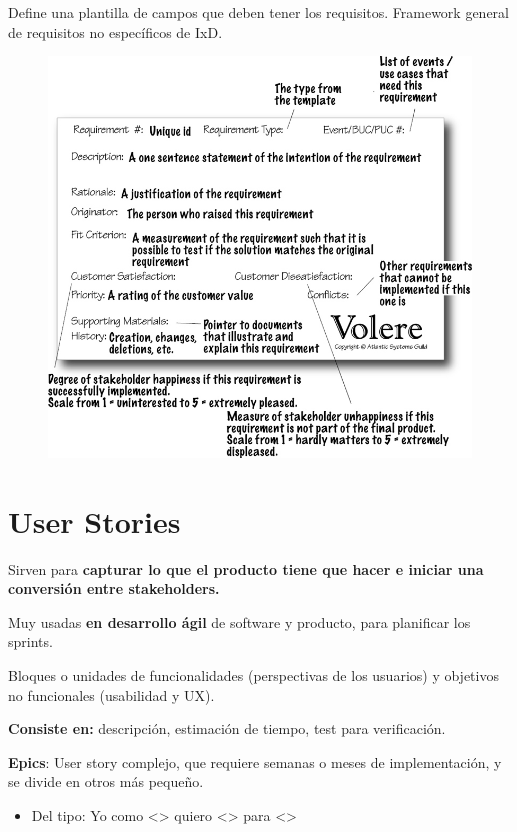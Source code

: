 \documentclass[12pt]{report} %
\begin{document}
Define una plantilla de campos que deben tener los requisitos. Framework
general de requisitos no específicos de IxD.
\begin{figure}[H]
	{\includegraphics[scale=.4]{2_9_volere_snow_card_alt.jpg}}
\end{figure}

\section{User Stories}

Sirven para \textbf{capturar lo que el producto tiene que hacer e iniciar
una conversión entre stakeholders.}

Muy usadas \textbf{en desarrollo ágil} de software y producto, para
planificar los sprints.

Bloques o unidades de funcionalidades (perspectivas de los usuarios) y
objetivos no funcionales (usabilidad y UX).

\textbf{Consiste en:} descripción, estimación de tiempo, test para
verificación.

\textbf{Epics}: User story complejo, que requiere semanas o meses de
implementación, y se divide en otros más pequeño.

\begin{itemize}

\item
  Del tipo: Yo como \textless\textgreater{} quiero
  \textless\textgreater{} para \textless\textgreater{}
\end{itemize}
\end{document}
